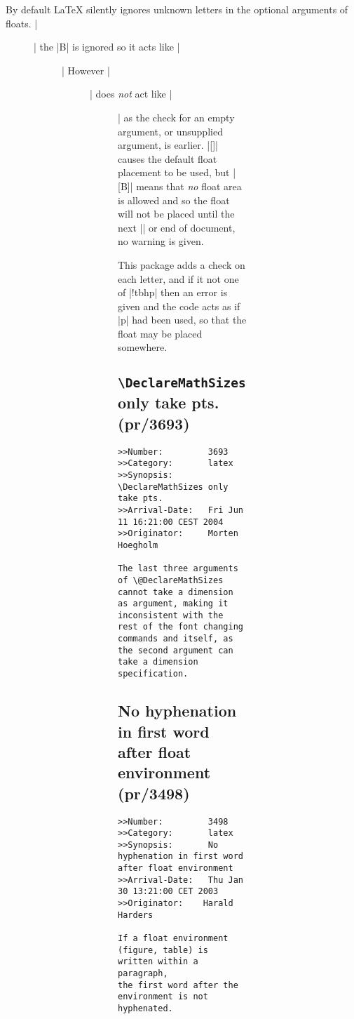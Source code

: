 \documentclass{ltxguide}
\begin{document}
By default LaTeX silently ignores unknown letters in the optional
arguments of floats. |\begin{figure}[tB]| the |B| is ignored so it
acts like |\begin{figure}[t]| However |\begin{figure}[B]| does
\emph{not} act like |\begin{figure}[]| as the check for an empty
argument, or unsupplied argument, is earlier. |[]| causes the
default float placement to be used, but |[B]| means that \emph{no}
float area is allowed and so the float will not be placed until the
next |\clearpage| or end of document, no warning is given.

This package adds a check on each letter, and if it not one of
|!tbhp| then an error is given and the code acts as if |p| had been
used, so that the float may be placed somewhere.

\subsection{\texttt{\textbackslash DeclareMathSizes} only take pts.
    (pr/3693)}

\begin{verbatim}
>>Number:         3693
>>Category:       latex
>>Synopsis:       \DeclareMathSizes only take pts.
>>Arrival-Date:   Fri Jun 11 16:21:00 CEST 2004
>>Originator:     Morten Hoegholm

The last three arguments of \@DeclareMathSizes cannot take a dimension
as argument, making it inconsistent with the rest of the font changing
commands and itself, as the second argument can take a dimension
specification.
\end{verbatim}

\subsection{No hyphenation in first word after float environment (pr/3498)}

\begin{verbatim}
>>Number:         3498
>>Category:       latex
>>Synopsis:       No hyphenation in first word after float environment
>>Arrival-Date:   Thu Jan 30 13:21:00 CET 2003
>>Originator:    Harald Harders

If a float environment (figure, table) is written within a paragraph,
the first word after the environment is not hyphenated.
\end{verbatim}


\end{figure}
\end{figure}
\end{figure}
\end{figure}
\end{document}
